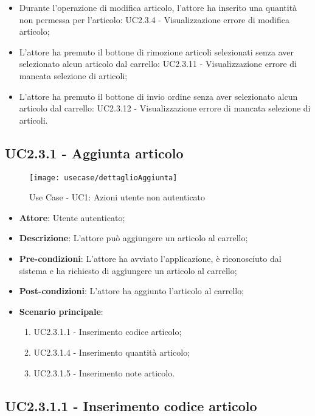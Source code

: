 \begin{itemize}
\begin{itemize}
			\item Durante l'operazione di modifica articolo, l'attore ha inserito una quantità non permessa per l'articolo: UC2.3.4 - Visualizzazione errore di modifica articolo;
			\item L'attore ha premuto il bottone di rimozione articoli selezionati senza aver selezionato alcun articolo dal carrello: UC2.3.11 - Visualizzazione errore di mancata selezione di articoli;
			\item L'attore ha premuto il bottone di invio ordine senza aver selezionato alcun articolo dal carrello: UC2.3.12 - Visualizzazione errore di mancata selezione di articoli.
		\end{itemize}
\end{itemize}

\subsection{UC2.3.1 - Aggiunta articolo}

\begin{figure}[!h] 
    \centering 
    \texttt{[image: usecase/dettaglioAggiunta]} 
    \caption{Use Case - UC1: Azioni utente non autenticato}
\end{figure}

\begin{itemize}
	\item \textbf{Attore}: Utente autenticato;
	\item \textbf{Descrizione}: L'attore può aggiungere un articolo al carrello;
	\item \textbf{Pre-condizioni}: L'attore ha avviato l'applicazione, è riconosciuto dal sistema e ha richiesto di aggiungere un articolo al carrello;
	\item \textbf{Post-condizioni}: L'attore ha aggiunto l'articolo al carrello;
	\item \textbf{Scenario principale}:
		\begin{enumerate}
			\item UC2.3.1.1 - Inserimento codice articolo;
			\item UC2.3.1.4 - Inserimento quantità articolo;
			\item UC2.3.1.5 - Inserimento note articolo.
		\end{enumerate}
\end{itemize}

\subsection{UC2.3.1.1 - Inserimento codice articolo}

